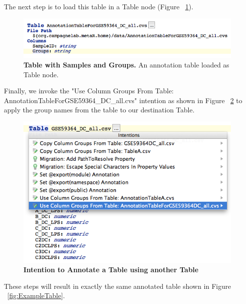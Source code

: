 The next step is to load this table in a Table node (Figure ~\ref{fig:NewAnnotationTable}).   
\begin{figure}[h!tbp]
  \centering
  \includegraphics[width=\figWidthWide]{figures/AnnotationTable.png}
\caption[Table with Samples and Groups]{\textbf{Table with Samples and Groups.} An annotation table loaded as Table node.}
\label{fig:NewAnnotationTable}
\end{figure}

Finally, we invoke the "Use Column Groups From Table: AnnotationTableForGSE59364\_DC\_all.cvs" intention as shown in Figure ~\ref{fig:AnnotateTableIntention} to apply the group names from the table to our destination Table. 
\begin{figure}[h!tbp]
  \centering
  \includegraphics[width=\figWidthWide]{figures/AnnotateTableIntention.png}
\caption[Intention to Annotate a Table using another Table]{\textbf{Intention to Annotate a Table using another Table} }
\label{fig:AnnotateTableIntention}
\end{figure}

These steps will result in exactly the same annotated table shown in Figure ~\ref{fig:ExampleTable}.